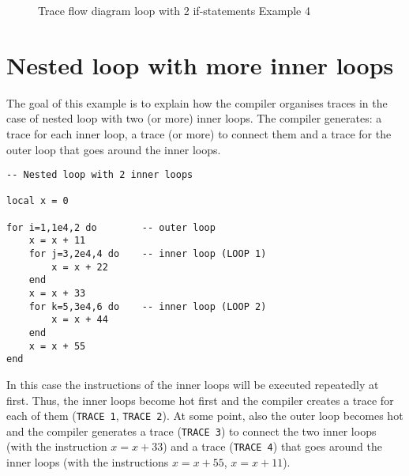 \begin{figure}[H]
\caption{Trace flow diagram loop with 2 if-statements Example 4}
\label{fig:}
\end{figure}

\newpage

\section{Nested loop with more inner loops}
\label{section:2-inner-loops}

The goal of this example is to explain how the compiler organises traces in the case of nested loop with two (or more) inner loops. The compiler generates: a trace for each inner loop, a trace (or more) to connect them
and a trace for the outer loop that goes around the inner loops.

\begin{mdframed}[style=LuaStyleFrame]
\begin{lstlisting}[style=LuaStyle]
-- Nested loop with 2 inner loops

local x = 0

for i=1,1e4,2 do        -- outer loop
	x = x + 11
    for j=3,2e4,4 do    -- inner loop (LOOP 1)
		x = x + 22
	end
	x = x + 33
    for k=5,3e4,6 do    -- inner loop (LOOP 2)
		x = x + 44
	end
	x = x + 55
end
\end{lstlisting}
\end{mdframed}

\noindent
In this case the instructions of the inner loops will be executed repeatedly at first. Thus, the inner loops become hot first and the compiler creates a trace for each of them (\texttt{TRACE 1}, \texttt{TRACE 2}). At some point, also the outer loop becomes hot and the compiler generates a trace (\texttt{TRACE 3}) to connect the two inner loops (with the instruction $x=x+33$) and a trace (\texttt{TRACE 4}) that goes around the inner loops (with the instructions $x=x+55$, $x=x+11$).

